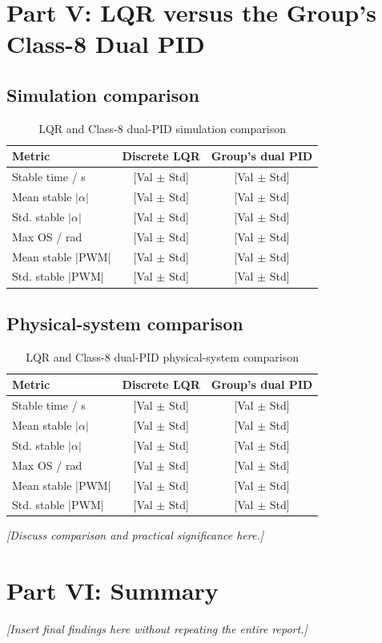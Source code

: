 \documentclass[12pt,a4paper]{article}
\begin{document}
\section{Part V: LQR versus the Group's Class-8 Dual PID}

\subsection{Simulation comparison}
\begin{table}[h!]
    \centering
    \caption{LQR and Class-8 dual-PID simulation comparison}
    \begin{tabular}{lcc}
        \toprule
        \textbf{Metric} & \textbf{Discrete LQR} & \textbf{Group's dual PID} \\
        \midrule
        Stable time / s & [Val $\pm$ Std] & [Val $\pm$ Std] \\
        Mean stable $|\alpha|$ & [Val $\pm$ Std] & [Val $\pm$ Std] \\
        Std. stable $|\alpha|$ & [Val $\pm$ Std] & [Val $\pm$ Std] \\
        Max OS / rad & [Val $\pm$ Std] & [Val $\pm$ Std] \\
        Mean stable |PWM| & [Val $\pm$ Std] & [Val $\pm$ Std] \\
        Std. stable |PWM| & [Val $\pm$ Std] & [Val $\pm$ Std] \\
        \bottomrule
    \end{tabular}
\end{table}

\subsection{Physical-system comparison}
\begin{table}[h!]
    \centering
    \caption{LQR and Class-8 dual-PID physical-system comparison}
    \begin{tabular}{lcc}
        \toprule
        \textbf{Metric} & \textbf{Discrete LQR} & \textbf{Group's dual PID} \\
        \midrule
        Stable time / s & [Val $\pm$ Std] & [Val $\pm$ Std] \\
        Mean stable $|\alpha|$ & [Val $\pm$ Std] & [Val $\pm$ Std] \\
        Std. stable $|\alpha|$ & [Val $\pm$ Std] & [Val $\pm$ Std] \\
        Max OS / rad & [Val $\pm$ Std] & [Val $\pm$ Std] \\
        Mean stable |PWM| & [Val $\pm$ Std] & [Val $\pm$ Std] \\
        Std. stable |PWM| & [Val $\pm$ Std] & [Val $\pm$ Std] \\
        \bottomrule
    \end{tabular}
\end{table}

\textit{[Discuss comparison and practical significance here.]}

\section{Part VI: Summary}
\textit{[Insert final findings here without repeating the entire report.]}
\end{document}
